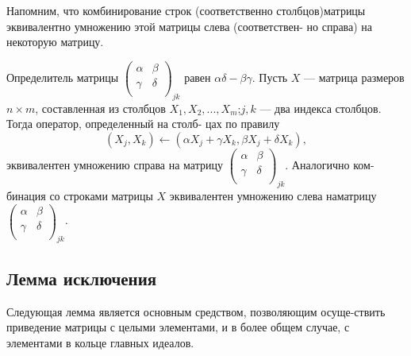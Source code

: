 \documentclass{mai_book}
\begin{document}
  Напомним, что комбинирование строк (соответственно столбцов)\linebreak матрицы эквивалентно умножению этой матрицы слева (соответствен- \linebreak но справа) на некоторую матрицу.
\begin{predl}  
  Определитель матрицы ${\left( \begin{array}{ccc}
\alpha & \beta \\
\gamma & \delta \\
\end{array} \right)}_{jk}$ равен $\alpha \delta - \beta \gamma$. Пусть $X$ --- матрица \linebreak размеров $n \times m$, составленная из столбцов $X_1, X_2, ..., X_m$;\linebreak $j,k$ --- два индекса столбцов. Тогда оператор, определенный на столб- \linebreak цах по правилу
$$(X_j, X_k)\gets (\alpha X_j + \gamma X_k, \beta X_j + \delta X_k),$$
эквивалентен умножению справа на матрицу ${\left( \begin{array}{ccc}
\alpha & \beta \\
\gamma & \delta \\
\end{array} \right)}_{jk}$. Аналогично ком-\linebreak бинация со строками матрицы $X$ эквивалентен умножению слева на\linebreak матрицу ${\left( \begin{array}{ccc}
\alpha & \beta \\
\gamma & \delta \\
\end{array} \right)}_{jk}$.\linebreak
\end{predl}
\subsection{Лемма исключения}
Следующая лемма является основным средством, позволяющим осуще-\linebreak ствить приведение матрицы с целыми элементами, и в более общем \linebreak случае, с элементами в кольце главных идеалов.\linebreak
\end{document}
